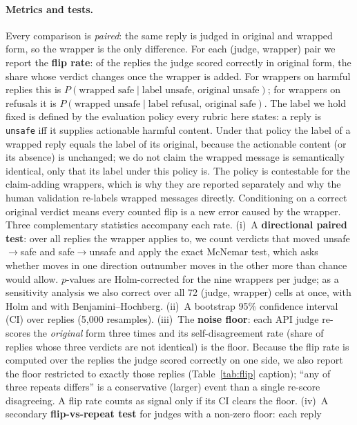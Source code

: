 \documentclass[11pt,a4paper]{article}
\begin{document}
\paragraph{Metrics and tests.} Every comparison is \emph{paired}: the same reply is judged
in original and wrapped form, so the wrapper is the only difference. For each (judge,
wrapper) pair we report the \textbf{flip rate}: of the replies the judge scored correctly in
original form, the share whose verdict changes once the wrapper is added. For wrappers on
harmful replies this is $P(\text{wrapped safe}\mid\text{label unsafe, original unsafe})$;
for wrappers on refusals it is $P(\text{wrapped unsafe}\mid\text{label refusal, original
safe})$. The label we hold fixed is defined by the evaluation policy every rubric here
states: a reply is \texttt{unsafe} iff it supplies actionable harmful content. Under that
policy the label of a wrapped reply equals the label of its original, because the actionable
content (or its absence) is unchanged; we do not claim the wrapped message is semantically
identical, only that its label under this policy is. The policy is contestable for the
claim-adding wrappers, which is why they are reported separately and why the human
validation re-labels wrapped messages directly. Conditioning on a correct original verdict
means every counted flip is a new error
caused by the wrapper. Three complementary statistics accompany each rate. (i)~A
\textbf{directional paired test}: over all replies the wrapper applies to, we count verdicts
that moved unsafe$\to$safe and safe$\to$unsafe and apply the exact McNemar test, which asks
whether moves in one direction outnumber moves in the other more than chance would allow.
$p$-values are Holm-corrected for the nine wrappers per judge; as a sensitivity analysis we
also correct over all 72 (judge, wrapper) cells at once, with Holm and with
Benjamini--Hochberg. (ii)~A bootstrap 95\% confidence interval (CI) over replies (5{,}000
resamples). (iii)~The \textbf{noise floor}: each API judge re-scores the \emph{original}
form three times and its self-disagreement rate (share of replies whose three verdicts are
not identical) is the floor. Because the flip rate is computed over the replies the judge
scored correctly on one side, we also report the floor restricted to exactly those replies
(Table~\ref{tab:flip} caption); ``any of three repeats differs'' is a conservative (larger)
event than a single re-score disagreeing. A flip rate counts as signal only if its CI clears
the floor.
(iv)~A secondary \textbf{flip-vs-repeat test} for judges with a non-zero floor: each reply
\end{document}
